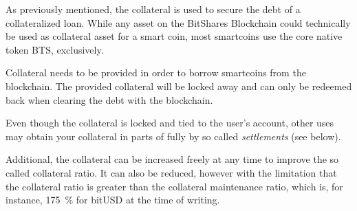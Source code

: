 \label{sec:collateral}

As previously mentioned, the collateral is used to secure the debt of a
collateralized loan. While any asset on the BitShares Blockchain could
technically be used as collateral asset for a smart coin, most smartcoins
use the core native token BTS, exclusively.

Collateral needs to be provided in order to borrow smartcoins from the
blockchain. The provided collateral will be locked away and can only be
redeemed back when clearing the debt with the blockchain.

Even though the collateral is locked and tied to the user's account, other uses
may obtain your collateral in parts of fully by so called \emph{settlements}
(see below).

Additional, the collateral can be increased freely at any time to improve the
so called collateral ratio. It can also be reduced, however with the limitation
that the collateral ratio is greater than the collateral maintenance ratio,
which is, for instance, \SI{175}{\percent} for bitUSD at the time of writing.
